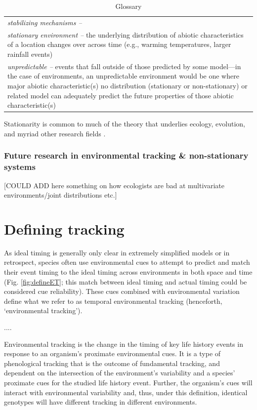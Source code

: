 \documentclass[11pt,letterpaper]{article}
\begin{document}
\begin{center}
\begin{table}
\begin{tabular}{ p{12 cm}  }
\emph{stabilizing mechanisms --} \\
\emph{stationary environment --} the underlying distribution of abiotic characteristics of a location changes over across time (e.g., warming temperatures, larger rainfall events)  \\
\emph{unpredictable --}  events that fall outside of those predicted by some model---in the case of environments, an unpredictable environment would be one where major abiotic characteristic(s) no distribution (stationary or non-stationary) or related model can adequately predict the future properties of those abiotic characteristic(s)   \\
\hline \hline
\end{tabular}
\caption{Glossary}
 \label{tab:gloss}
\end{table}
\end{center}



Stationarity is common to much of the theory that underlies ecology, evolution, and myriad other research fields \citep[e.g.,][]{Milly:2008yu,nosenko2013}. 

\subsubsection{Future research in environmental tracking \& non-stationary systems}

[COULD ADD here something on how ecologists are bad at multivariate environments/joint distributions etc.] 

\section{Defining tracking}

As ideal timing is generally only clear in extremely simplified models or in retrospect, species often use environmental cues to attempt to predict and match their event timing to the ideal timing across environments in both space and time (Fig. \ref{fig:defineET}; this match between ideal timing and actual timing could be considered cue reliability). These cues combined with environmental variation define what we refer to as temporal environmental tracking (henceforth, `environmental tracking').

....

Environmental tracking is the change in the timing of key life history events in response to an organism's proximate environmental cues. It is a type of phenological tracking that is the outcome of fundamental tracking, and dependent on the intersection of the environment's variability and a species' proximate cues for the studied life history event. Further, the organism's cues will interact with environmental variability and, thus, under this definition, identical genotypes will have different tracking in different environments.
\end{document}
